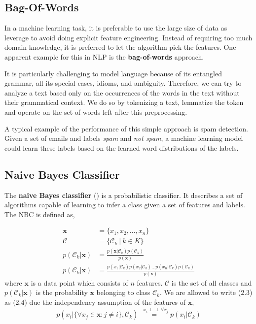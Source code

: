 \subsection{Bag-Of-Words}\label{section:bow}
In a machine learning task, it is preferable to use the large size of data as leverage to avoid doing explicit feature engineering.
Instead of requiring too much domain knowledge, it is preferred to let the algorithm pick the features.
One apparent example for this in NLP is the \textbf{bag-of-words} approach.

It is particularly challenging to model language because of its entangled grammar, all its special cases, idioms, and ambiguity.
Therefore, we can try to analyze a text based only on the occurrences of the words in the text without their grammatical context. We do so by tokenizing a text, lemmatize the token and operate on the set of words left after this preprocessing.

A typical example of the performance of this simple approach is spam detection.
Given a set of emails and labels \emph{spam} and \emph{not spam}, a machine learning model could learn these labels based on the learned word distributions of the labels.

\subsection{Naive Bayes Classifier}\label{section:nbc}
The \textbf{naive Bayes classifier} () is a probabilistic classifier. It describes a set of algorithms capable of learning to infer a class given a set of features and labels. The NBC is defined as,

\begin{align}
  \boldsymbol{x} &= \{x_1, x_2, \dots, x_n\} \\
  \mathcal{C} &= \{\mathcal{C}_k \: | \: k \in K \} \\
  p(\mathcal{C}_k|\boldsymbol{x}) &= \frac{p(\boldsymbol{x} |\mathcal{C}_k) p(\mathcal{C}_k)} {p(\boldsymbol{x})} \\
  p(\mathcal{C}_k|\boldsymbol{x}) &= \frac{p(x_1 |\mathcal{C}_k)
                                       p(x_2 |\mathcal{C}_k) \dots
                                       p(x_n |\mathcal{C}_k)
                                       p(\mathcal{C}_k)}{p(\boldsymbol{x})}
\end{align}
where $\boldsymbol{x}$ is a data point which consists of $n$ features. $\mathcal{C}$ is the set of all classes and $p(\mathcal{C}_k|\boldsymbol{x})$ is the probability $\boldsymbol{x}$ belonging to class $\mathcal{C}_k$. We are allowed to write (2.3) as (2.4) due the independency assumption of the features of $\boldsymbol{x}$,
 \[p(x_i| \{\forall x_j \in \boldsymbol{x} : j \neq i \}, \mathcal{C}_k) \overset{\, \,\,\,x_i\perp\!\!\!\perp \forall x_j}{=} p(x_i|\mathcal{C}_k)\]

